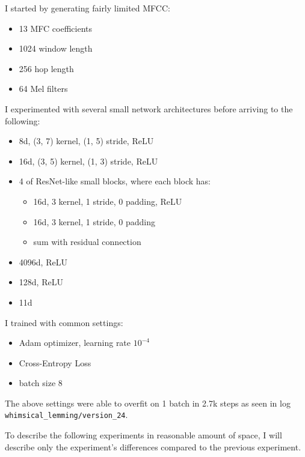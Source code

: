 \documentclass[11pt]{article}
\newcommand{\Log}[1]{{\small\texttt{#1}}}
\begin{document}
I started by generating fairly limited MFCC:
\begin{itemize}
  \item 13 MFC coefficients
  \item 1024 window length
  \item 256 hop length
  \item 64 Mel filters
\end{itemize}

I experimented with several small network architectures before arriving to the following:

\small
\begin{itemize}
  \item 8d, (3, 7) kernel, (1, 5) stride, ReLU
  \item 16d, (3, 5) kernel, (1, 3) stride, ReLU
  \item 4 of ResNet-like small blocks, where each block has:
    \begin{itemize}
      \item 16d, 3 kernel, 1 stride, 0 padding, ReLU
      \item 16d, 3 kernel, 1 stride, 0 padding
      \item sum with residual connection
    \end{itemize}
  \item 4096d, ReLU
  \item 128d, ReLU
  \item 11d
\end{itemize}
\normalsize

I trained with common settings:
\begin{itemize}
  \item Adam optimizer, learning rate $10^{-4}$
  \item Cross-Entropy Loss
  \item batch size 8
\end{itemize}

The above settings were able to overfit on 1 batch in 2.7k steps as seen in log
\Log{whimsical\_lemming/version\_24}.

To describe the following experiments in reasonable amount of space, I will
describe only the experiment's differences compared to the previous experiment.
\end{document}
